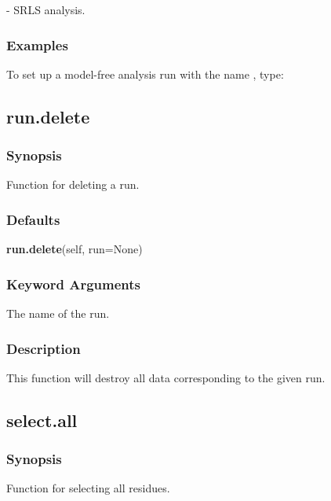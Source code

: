  - SRLS analysis.


\subsubsection{Examples}

To set up a model-free analysis run with the name 
, type:




\newpage

\subsection{run.delete}


\subsubsection{Synopsis}

Function for deleting a run.

\subsubsection{Defaults}

\textsf{\textbf{run.delete}(self, run=None)}


\subsubsection{Keyword Arguments}


  The name of the run.

\subsubsection{Description}

This function will destroy all data corresponding to the given run.


\newpage

\subsection{select.all}


\subsubsection{Synopsis}

Function for selecting all residues.

